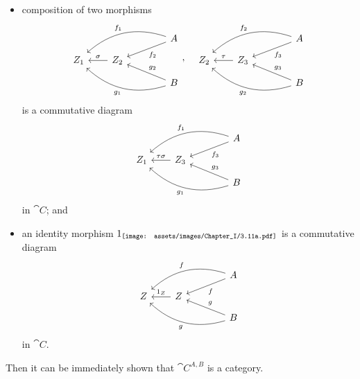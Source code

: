 {\begin{itemize}[label=$\bullet$]
        \item composition of two morphisms
        \[\begin{array}{ll}
            \begin{tikzcd}[row sep=0.8em,column sep=2em,ampersand replacement=\&]
                \&\&\& A \ar[dll, "f_2"] \ar[dlll, swap, bend right, "f_1"] \\
                Z_1 \& Z_2 \ar[l, swap, "\sigma"] \\
                \&\&\& B \ar[ull, swap, "g_2"] \ar[ulll, bend left, "g_1"]
            \end{tikzcd}, &
            \begin{tikzcd}[row sep=0.8em,column sep=2em,ampersand replacement=\&]
                \&\&\& A \ar[dll, "f_3"] \ar[dlll, swap, bend right, "f_2"] \\
                Z_2 \& Z_3 \ar[l, swap, "\tau"] \\
                \&\&\& B \ar[ull, swap, "g_3"] \ar[ulll, bend left, "g_2"]
            \end{tikzcd}
        \end{array}\]
        is a commutative diagram
        \[\begin{tikzcd}[row sep=0.8em,column sep=2em,ampersand replacement=\&]
            \&\&\& A \ar[dll, "f_3"] \ar[dlll, swap, bend right, "f_1"] \\
            Z_1 \& Z_3 \ar[l, swap, "\tau\sigma"] \\
            \&\&\& B \ar[ull, swap, "g_3"] \ar[ulll, bend left, "g_1"]
        \end{tikzcd}\]
        in $\cat{C}$; and
        
        \item an identity morphism $\mathrm{1}_{\texttt{[image: assets/images/Chapter\_I/3.11a.pdf]}}$ is a commutative diagram
        \[\begin{tikzcd}[row sep=0.8em,column sep=2em,ampersand replacement=\&]
            \&\&\& A \ar[dll, "f"] \ar[dlll, swap, bend right, "f"] \\
            Z \& Z \ar[l, swap, "\one_Z"] \\
            \&\&\& B \ar[ull, swap, "g"] \ar[ulll, bend left, "g"]
        \end{tikzcd}\]
        in $\cat{C}$. 
    \end{itemize}
    Then it can be immediately shown that $\cat{C}^{A,B}$ is a category.

}
